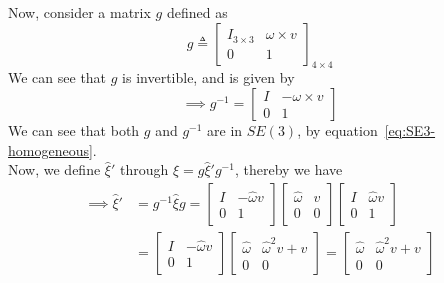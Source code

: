 Now, consider a matrix \( g \) defined as
\begin{equation*}
      g \triangleq
      \begin{bmatrix}
            I_{3\times 3} & \omega \times v \\
            0             & 1
      \end{bmatrix}_{4\times 4}
\end{equation*}
We can see that \( g \) is invertible, and is given by
\begin{equation*}
      \implies
      g^{-1} =
      \begin{bmatrix}
            I & - \omega \times v \\
            0 & 1
      \end{bmatrix}
\end{equation*}
We can see that both \( g \) and \( g^{-1} \) are in \(SE(3)\), by equation~\eqref{eq:SE3-homogeneous}.\\
Now, we define \( \hat{\xi}' \) through \( \hat \xi = g \hat{\xi}' g^{-1} \), thereby we have
\begin{align*}
      \implies
      \hat{\xi}'
       & =
      g^{-1} \hat{\xi} g
      =
      \begin{bmatrix}
            I & - \hat \omega v \\
            0 & 1
      \end{bmatrix}
      \begin{bmatrix}
            \hat \omega & v \\
            0           & 0
      \end{bmatrix}
      \begin{bmatrix}
            I & \hat \omega v \\
            0 & 1
      \end{bmatrix}
      \\ & =
      \begin{bmatrix}
            I & - \hat \omega v \\
            0 & 1
      \end{bmatrix}
      \begin{bmatrix}
            \hat \omega & {\hat{\omega}}^2 v + v \\
            0           & 0
      \end{bmatrix}
      =
      \begin{bmatrix}
            \hat \omega & {\hat{\omega}}^2 v + v \\
            0           & 0
      \end{bmatrix}
\end{align*}

